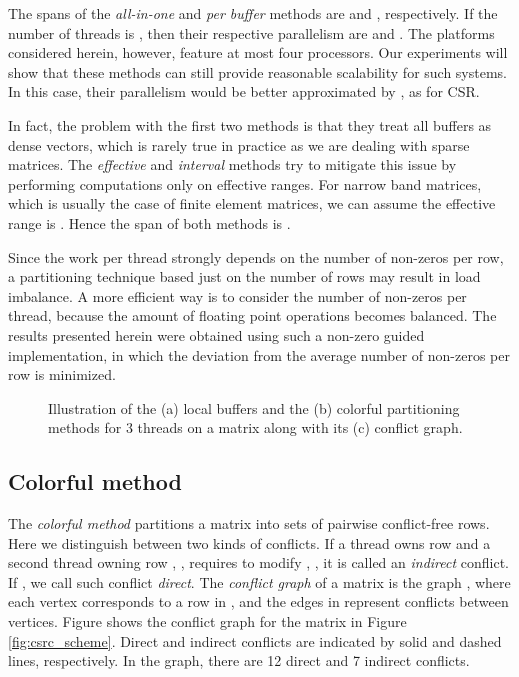 \documentclass[11pt]{article}
\begin{document}
The spans of the \textit{all-in-one} and \textit{per buffer} methods are  and , respectively.
If the number of threads is , then their respective parallelism are  and .
The platforms considered herein,
however, feature at most four processors. Our experiments will show that
these methods can still provide reasonable scalability for such systems.
In this case, their parallelism would be better approximated by , as for CSR.

In fact, the problem with the first two methods is that they treat all buffers as dense vectors, which is rarely true in practice as we are dealing with sparse matrices.
The \textit{effective} and \textit{interval} methods try to mitigate this issue by performing computations only on effective ranges.
For narrow band matrices, which is usually the case of finite element matrices, we can assume the effective range is .
Hence the span of both methods is .

Since the work per thread strongly depends on the number of non-zeros per row,
a partitioning technique based just on the number of rows may result in load
imbalance.  A more efficient way is to consider the number of non-zeros per
thread, because the amount of floating point operations becomes balanced.  The
results presented herein were obtained using such a non-zero guided implementation,
in which the deviation from the average number of non-zeros per row
is minimized.

\begin{figure}[t]
\centering
{}
\hfil
{}
\hfil
{}
\caption{Illustration of the (a) local buffers and the (b) colorful
partitioning methods for 3 threads on a  matrix along with its (c) conflict graph.}
\label{fig:partitioning}
\end{figure}

\subsection{Colorful method}

The \textit{colorful method} partitions a matrix into sets of pairwise
conflict-free rows.
Here we distinguish between two kinds of conflicts.
If a thread owns row  and a second thread owning row , , requires
to modify , , it is called an \textit{indirect} conflict.
If , we call such conflict \textit{direct}.
The \textit{conflict graph} of a matrix  is the graph ,
where each vertex  corresponds to a row in , and the edges in 
represent conflicts between vertices.
Figure  shows the conflict graph for the matrix in
Figure \ref{fig:csrc_scheme}.
Direct and indirect conflicts are indicated by solid and dashed lines,
respectively.  In the graph, there are 12 direct and 7 indirect conflicts.
\end{document}
